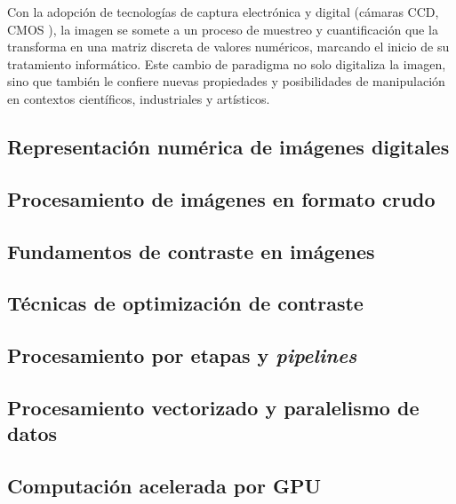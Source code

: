 Con la adopción de tecnologías de captura electrónica y digital (cámaras
CCD, CMOS \cite{camaras_ccd_cmos}), la imagen se somete a un proceso de muestreo y cuantificación
que la transforma en una matriz discreta de valores numéricos, marcando el inicio de su 
tratamiento informático. Este cambio de paradigma no solo digitaliza la imagen, sino que 
también le confiere nuevas propiedades y posibilidades de manipulación en contextos 
científicos, industriales y artísticos.

\newpage

\subsection{Representación numérica de imágenes digitales} \label{subsec:3_2_representacion_numerica_imagenes_digitales}

\subsection{Procesamiento de imágenes en formato crudo} \label{subsec:3_3_procesamiento_imagenes_crudo}

\subsection{Fundamentos de contraste en imágenes} \label{subsec:3_4_fundamentos_contraste_imagenes} 

\subsection{Técnicas de optimización de contraste} \label{subsec:3_5_tecnicas_optimizacion_contraste}

\subsection{Procesamiento por etapas y \textit{pipelines}} \label{subsec:3_6_procesamiento_por_etapas_pipelines}

\subsection{Procesamiento vectorizado y paralelismo de datos} \label{subsec:3_7_procesamiento_vectorizado_paralelismo_datos}    

\subsection{Computación acelerada por GPU} \label{subsec:3_8_computacion_acelerada_gpu}